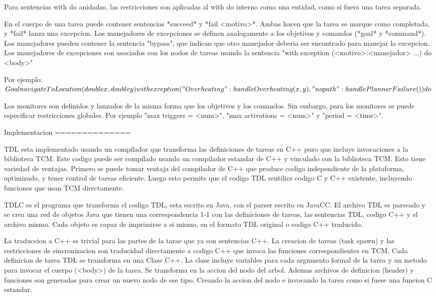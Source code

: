 Para sentencias with do anidadas, las restricciones son aplicadas al 
with do interno como una entidad, como si fuera una tarea separada.

En el cuerpo de una tarea puede contener sentencias *succeed* y *fail <motivo>*.
Ambas hacen que la tarea se marque como completada, y *fail* lanza una excepcion.
Los manejadores de excepciones se definen analogamente a los objetivos y comandos (*goal* y *command*).
Los manejadores pueden contener la sentencia "bypass", que indican que otro
manejador deberia ser encontrado para manejar la excepcion.
Los manejadores de excepciones son asociados con los nodos de tareas usando
la sentencia "with exception (<motivo>:<manejador> ...) do {<body>}"

Por ejemplo:
$
Goal navigateToLocation(double x, double y) {
  with exception
    ("Overheating": handleOverheating(x, y),
     "no path": handlePlannerFailure()) do {

     }
}
$

Los monitores son definidos y lanzados de la misma forma que los objetivos
y los comandos.
Sin embargo, para los monitores se puede especificar restricciones globales.
Por ejemplo "max triggers = <num>", "max activations = <num>"
y "period = <time>".

Implementacion
==============

TDL esta implementado usando un compilador que transforma las definiciones
de tareas en C++ puro que incluye invocaciones a la biblioteca TCM.
Este codigo puede ser compilado usando un compilador estandar de C++ y
vinculado con la biblioteca TCM.
Esto tiene variedad de ventajas. Primero se puede tomar ventaja del
compilador de C++ que produce codigo independiente de la plataforma,
optimizado, y tener control de tareas eficiente.
Luego esto permite que el codigo TDL reutilice codigo C y C++ existente,
incluyendo funciones que usan TCM directamente.

TDLC es el programa que transforma el codigo TDL, esta escrito en Java, con
el parser escrito en JavaCC.
El archivo TDL es parseado y se crea una red de objetos Java que tienen
una correspondencia 1-1 con las definiciones de tareas, las sentencias
TDL, codigo C++ y el archivo mismo.
Cada objeto es capaz de imprimirse a si mismo, en el formato TDL original
o codigo C++ traducido.

La traduccion a C++ es trivial para las partes de la tarae que ya son
sentencias C++.
La creacion de tareas (task spawn) y las restricciones de sincronizacion
son traducidad directamente a codigo C++ que invoca las funciones 
correspondientes en TCM.
Cada definicion de tarea TDL se transforma en una Clase C++.
La clase incluye variables para cada argumento formal de la tarea y
un metodo para invocar el cuerpo (<body>) de la tarea. Se transforma
en la accion del nodo del arbol.
Ademas archivos de definicion (header) y funciones son generadas para
crear un nuevo nodo de ese tipo. Creando la accion del nodo e invocando
la tarea como si fuese una funcion C estandar.

